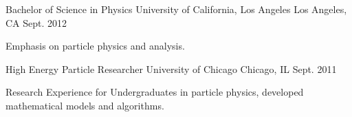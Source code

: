 


\begin{cventries}


\cventry
{Bachelor of Science in Physics} %
{University of California, Los Angeles} %
{Los Angeles, CA} %
{Sept. 2012} %
{ %
\begin{cvitems}
\item {Emphasis on particle physics and analysis.}
\end{cvitems}
}

\cventry
{High Energy Particle Researcher} %
{University of Chicago} %
{Chicago, IL} %
{Sept. 2011} %
{ %
\begin{cvitems}
\item {Research Experience for Undergraduates in particle physics, developed mathematical
models and algorithms.}
\end{cvitems}
}


\end{cventries}
